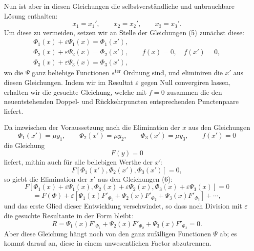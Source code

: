 \documentclass[10pt]{article}
\begin{document}
Nun ist aber in diesen Gleichungen die selbstverständliche und unbrauchbare Lösung enthalten:
\[
x_1=x_1',\qquad x_2=x_2',\qquad x_3=x_3'.
\]
Um diese zu vermeiden, setzen wir an Stelle der Gleichungen (5) zunächst diese:
\[
\tag{6}
\begin{gathered}
\Phi_1(x)+\varepsilon\Psi_1(x)=\Phi_1(x'),\\
\Phi_2(x)+\varepsilon\Psi_2(x)=\Phi_2(x'),\qquad f(x)=0,\quad f(x')=0,\\
\Phi_3(x)+\varepsilon\Psi_3(x)=\Phi_3(x'),
\end{gathered}
\]
wo die \(\Psi\) ganz beliebige Functionen \(s^{\text{ter}}\) Ordnung sind, und eliminiren die \(x'\) aus diesen Gleichungen. Indem wir im Resultat \(\varepsilon\) gegen Null convergiren lassen, erhalten wir die gesuchte Gleichung, welche mit \(f=0\) zusammen die den neuentstehenden Doppel- und Rückkehrpuncten entsprechenden Punctenpaare liefert.

Da inzwischen der Voraussetzung nach die Elimination der \(x\) aus den Gleichungen
\[
\Phi_1(x')=\mu y_1,\qquad
\Phi_2(x')=\mu y_2,\qquad
\Phi_3(x')=\mu y_3,\qquad
f(x')=0
\]
die Gleichung
\[
F(y)=0
\]
liefert, mithin auch für alle beliebigen Werthe der \(x'\):
\[
F[\Phi_1(x'),\Phi_2(x'),\Phi_3(x')]=0,
\]
so giebt die Elimination der \(x'\) aus den Gleichungen (6):
\[
F[\Phi_1(x)+\varepsilon\Psi_1(x),\Phi_2(x)+\varepsilon\Psi_2(x),
\Phi_3(x)+\varepsilon\Psi_3(x)]=0
\]
\[
=F(\Phi)+\varepsilon\left[
\Psi_1(x)F'_{\Phi_1}+\Psi_2(x)F'_{\Phi_2}+\Psi_3(x)F'_{\Phi_3}
\right]+\cdots,
\]
und das erste Glied dieser Entwicklung verschwindet, so dass nach Division mit \(\varepsilon\) die gesuchte Resultante in der Form bleibt:
\[
\tag{7}
R=\Psi_1(x)F'_{\Phi_1}+\Psi_2(x)F'_{\Phi_2}+\Psi_3(x)F'_{\Phi_3}=0.
\]
Aber diese Gleichung hängt noch von den ganz zufälligen Functionen \(\Psi\) ab; es kommt darauf an, diese in einem unwesentlichen Factor abzutrennen.
\end{document}
